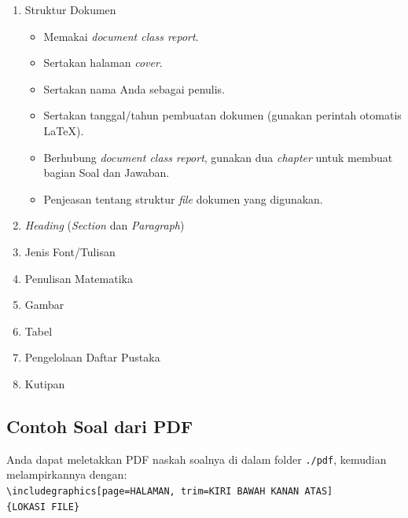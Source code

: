 \begin{enumerate}[nosep]
    \item Struktur Dokumen
    \begin{itemize}[leftmargin=.62cm]
        \item Memakai \textit{document class report}.
        \item Sertakan halaman \textit{cover}.
        \item Sertakan nama Anda sebagai penulis.
        \item Sertakan tanggal/tahun pembuatan dokumen (gunakan perintah otomatis LaTeX).
        \item Berhubung \textit{document class report}, gunakan dua \textit{chapter} untuk membuat bagian Soal dan Jawaban.
        \item Penjeasan tentang struktur \textit{file} dokumen yang digunakan.
    \end{itemize}
    \item \textit{Heading} (\textit{Section} dan \textit{Paragraph})
    \item Jenis Font/Tulisan
    \item Penulisan Matematika
    \item Gambar
    \item Tabel
    \item Pengelolaan Daftar Pustaka
    \item Kutipan
\end{enumerate}

\subsection{Contoh Soal dari PDF}

Anda dapat meletakkan PDF naskah soalnya di dalam folder \verb|./pdf|, kemudian melampirkannya dengan: \\
\verb|\includegraphics[page=HALAMAN, trim=KIRI BAWAH KANAN ATAS]| \\
\verb|{LOKASI FILE}|


